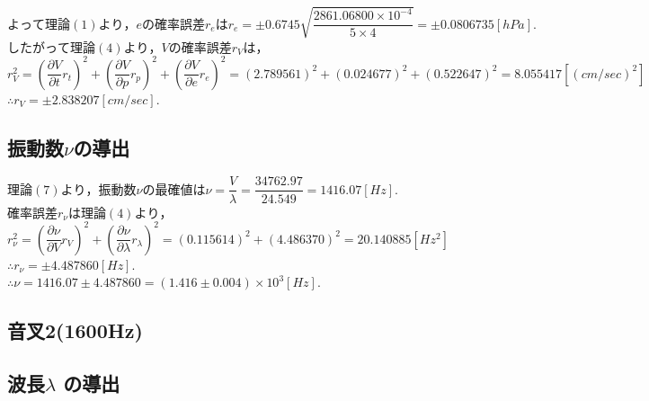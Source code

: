 \documentclass[a4paper,1pt]{jsarticle}
\begin{document}
$よって理論(1)より，eの確率誤差r_eはr_e=\pm0.6745\sqrt{\dfrac{2861.06800\times 10^{-4}}{5\times 4}}=\pm0.0806735[hPa].$\\

$したがって理論(4)より，Vの確率誤差r_Vは，$\\

$r_V^2=\left(\dfrac{\partial V}{\partial t}r_t\right)^2+\left(\dfrac{\partial V}{\partial p}r_p\right)^2+\left(\dfrac{\partial V}{\partial e}r_e\right)^2=(2.789561)^2+(0.024677)^2+(0.522647)^2=8.055417 [(cm/sec)^2]$\\

$\therefore r_V=\pm2.838207[cm/sec].$

\subsection*{振動数$\nu $の導出}

$理論(7)より，振動数\nu の最確値は\nu =\dfrac{V}{\lambda }=\dfrac{34762.97}{24.549}=1416.07[Hz].$\\

$確率誤差r_\nu は理論(4)より，$\\

$r_\nu ^2=\left(\dfrac{\partial \nu }{\partial V}r_V \right)^2+\left(\dfrac{\partial \nu }{\partial \lambda }r_\lambda \right)^2=(0.115614)^2+(4.486370)^2=20.140885[Hz^2]$\\

$\therefore r_\nu = \pm 4.487860[Hz].$\\

$\therefore \nu =1416.07\pm4.487860=(1.416\pm0.004)\times10^3[Hz].$

\subsection[2]{音叉2(1600Hz)}

\subsection*{波長$\lambda$ の導出}
\end{document}

